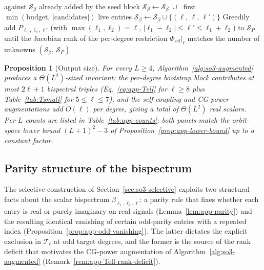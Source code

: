 \documentclass{article}
\newtheorem{proposition}[theorem]{Proposition}
\theoremstyle{definition}
\theoremstyle{remark}
\theoremstyle{definition}
\begin{document}
\begin{algorithm}[H]
\begin{algorithmic}[1]
    against $\mathcal{S}_\beta$ already added by the seed block
  \STATE $\mathcal{S}_\beta \leftarrow \mathcal{S}_\beta
    \;\cup\;$ first $\min(\text{budget},\,
    |\text{candidates}|)$ live entries
  \STATE {}
    \STATE $\mathcal{S}_\beta \leftarrow \mathcal{S}_\beta
      \cup \{(\ell,\, \ell,\, \ell')\}$
  \ENDFOR
  \STATE {}
  \STATE Greedily add $P_{\ell_1,\ell_2,\ell'}$ (with
    $\max(\ell_1,\ell_2) = \ell$, $|\ell_1{-}\ell_2| \le \ell'
    \le \ell_1{+}\ell_2$) to $\mathcal{S}_P$ until the
    Jacobian rank of the per-degree restriction
    $\Phi_{\mathrm{sel}}|_\ell$ matches the number of unknowns
\ENDFOR
\RETURN $(\mathcal{S}_\beta,\, \mathcal{S}_P)$
\end{algorithmic}
\end{algorithm}

\begin{proposition}[Output size]\label{prop:app-output-size}
For every $L\ge 4$, Algorithm~\ref{alg:so3-augmented} produces a
$\Theta(L^2)$-sized invariant: the per-degree bootstrap block
contributes at most $2\ell{+}1$ bispectral triples
(Eq.~\eqref{eq:app-Tell} for $\ell\ge 8$ plus
Table~\ref{tab:Tsmall} for $5\le\ell\le 7$), and the self-coupling
and CG-power augmentations add $O(\ell)$ per degree, giving a total
of $\Theta(L^2)$ real scalars. Per-$L$ counts are listed in
Table~\ref{tab:app-counts}; both panels match the orbit-space
lower bound $(L{+}1)^2-3$ of Proposition~\ref{prop:app-lower-bound}
up to a constant factor.
\end{proposition}



\subsection{Parity structure of the bispectrum}
\label{sec:app-parity}

The selective construction of Section~\ref{sec:so3-selective}
exploits two structural facts about the scalar bispectrum
$\beta_{\ell_1,\ell_2,\ell}$: a parity rule that fixes whether each
entry is real or purely imaginary on real signals (Lemma~\ref{lem:app-parity})
and the resulting identical vanishing of certain odd-parity entries
with a repeated index (Proposition~\ref{prop:app-odd-vanishing}). The
latter dictates the explicit exclusion in $\mathcal{T}_\ell$ at odd
target degrees, and the former is the source of the rank deficit
that motivates the CG-power augmentation of
Algorithm~\ref{alg:so3-augmented} (Remark~\ref{rem:app-Tell-rank-deficit}).
\end{document}
